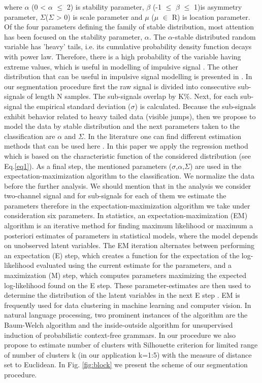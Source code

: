 \documentclass[10pt]{article}
\begin{document}
where $\alpha$ (0 < $\alpha$ $\leq$ 2) is stability parameter, $\beta$ (-1 $\leq$ $\beta$ $\leq$ 1)is asymmetry parameter, $\Sigma$($\Sigma$ > 0)  is scale parameter and $\mu$ ($\mu$ $\in$ R) is location parameter. Of the four parameters defining the family of stable distribution, most attention has been focused on the stability parameter, $\alpha$. The $\alpha$-stable distributed random variable has 'heavy' tails, i.e. its cumulative probability density function decays with power law. Therefore, there is a high probability of the variable having extreme values, which is useful in modelling of impulsive signal \cite{zak2014application}. The other distribution that can be useful in impulsive signal modelling is presented in \cite{stefaniak2015procedures}.
In our segmentation procedure first the raw signal is divided into consecutive sub-signals of length N samples. The sub-signals overlap by K$\%$. Next, for each sub-signal the empirical standard deviation ($\sigma$) is calculated. Because the sub-signals exhibit behavior related to heavy tailed data (visible jumps), then we propose to model the data by stable distribution and the next parameters taken to the classification are $\alpha$ and $\Sigma$. In the literature one can find different estimation methods that can be used here \cite{allen1977short,samorodnitsky1994stable}. In this paper we apply the regression method which is based on the characteristic function of the considered distribution (see Eq.\ref{eq1}).
As a final step, the mentioned parameters ($\sigma$,$\alpha$,$\Sigma$) are used in the expectation-maximization algorithm to the classification. We normalize the data before the further analysis. We should mention that in the analysis we consider two-channel signal and for sub-signals for each of them we estimate the parameters therefore in the expectation-maximization algorithm we take under consideration six parameters. 
In statistics, an expectation-maximization (EM) algorithm is an iterative method for finding maximum likelihood or maximum a posteriori estimates of parameters in statistical models, where the model depends on unobserved latent variables. The EM iteration alternates between performing an expectation (E) step, which creates a function for the expectation of the log-likelihood evaluated using the current estimate for the parameters, and a maximization (M) step, which computes parameters maximizing the expected log-likelihood found on the E step. These parameter-estimates are then used to determine the distribution of the latent variables in the next E step \cite{dempster1977maximum,sundberg1974maximum,neal1998view,hastie2001algorithm}. EM is frequently used for data clustering in machine learning and computer vision. In natural language processing, two prominent instances of the algorithm are the Baum-Welch algorithm and the inside-outside algorithm for unsupervised induction of probabilistic context-free grammars. In our procedure we also propose to estimate number of clusters with Silhouette criterion \cite{kaufman2009finding,rousseeuw1987silhouettes} for limited range of number of clusters k (in our application k=1:5) with the measure of distance set to Euclidean.
In Fig. \ref{fig:block} we present the scheme of our segmentation procedure.
\end{document}
